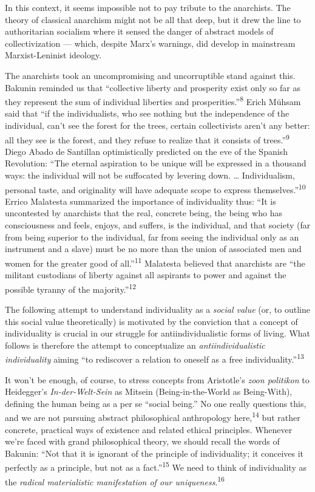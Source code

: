 In this context, it seems impossible not to pay tribute to the anarchists. The
theory of classical anarchism might not be all that deep, but it drew the line
to authoritarian socialism where it sensed the danger of abstract models of
collectivization — which, despite Marx’s warnings, did develop in mainstream
Marxist-Leninist ideology.

The anarchists took an uncompromising and uncorruptible stand against this.
Bakunin reminded us that “collective liberty and prosperity exist only so far as
they represent the sum of individual liberties and
prosperities.”\textsuperscript{8} Erich Mühsam said that “if the individualists,
who see nothing but the independence of the individual, can’t see the forest for
the trees, certain collectivists aren’t any better: all they see is the forest,
and they refuse to realize that it consists of trees.”\textsuperscript{9} Diego
Abado de Santillan optimistically predicted on the eve of the Spanish
Revolution: “The eternal aspiration to be unique will be expressed in a thousand
ways: the individual will not be suffocated by levering down. … Individualism,
personal taste, and originality will have adequate scope to express
themselves.”\textsuperscript{10} Errico Malatesta summarized the importance of
individuality thus: “It is uncontested by anarchists that the real, concrete
being, the being who has consciousness and feels, enjoys, and suffers, is the
individual, and that society (far from being superior to the individual, far
from seeing the individual only as an instrument and a slave) must be no more
than the union of associated men and women for the greater good of
all.”\textsuperscript{11} Malatesta believed that anarchists are “the militant
custodians of liberty against all aspirants to power and against the possible
tyranny of the majority.”\textsuperscript{12}

The following attempt to understand individuality as a \textit{social value}
(or, to outline this social value theoretically) is motivated by the conviction
that a concept of individuality is crucial in our struggle for
antiindividualistic forms of living. What follows is therefore the attempt to
conceptualize an \textit{antiindividualistic individuality} aiming “to
rediscover a relation to oneself as a free individuality.”\textsuperscript{13}

It won’t be enough, of course, to stress concepts from Aristotle’s \textit{zoon
politikon} to Heidegger’s \textit{In-der-Welt-Sein} as Mitsein
(Being-in-the-World as Being-With), defining the human being as a per se “social
being.” No one really questions this, and we are not pursuing abstract
philosophical anthropology here,\textsuperscript{14} but rather concrete,
practical ways of existence and related ethical principles. Whenever we’re faced
with grand philosophical theory, we should recall the words of Bakunin: “Not
that it is ignorant of the principle of individuality; it conceives it perfectly
as a principle, but not as a fact.”\textsuperscript{15} We need to think of
individuality as the \textit{radical materialistic manifestation of our
uniqueness}.\textsuperscript{16}


